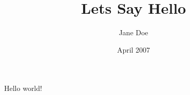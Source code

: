 \documentclass{article}
\title{Lets Say Hello}
\author{Jane Doe}
\date{April 2007}
\begin{document}
   \maketitle
   Hello world!
\end{document}
